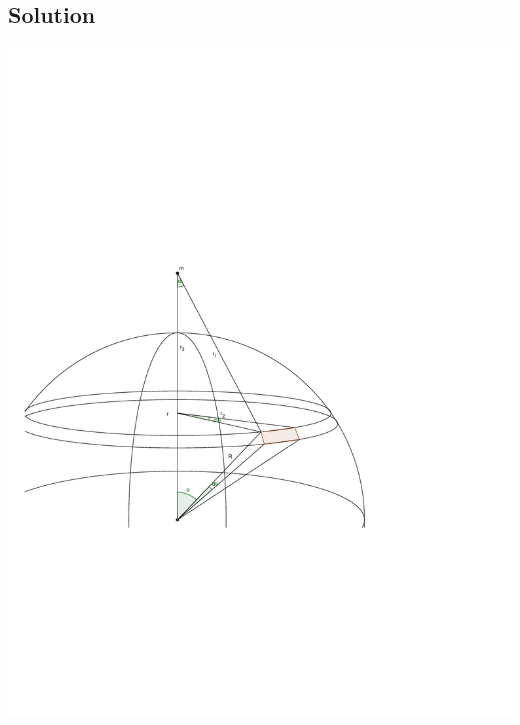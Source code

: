 \documentclass[solutions]{esg8012pset}
\begin{document}
\subsection*{Solution}
  \begin{center}\includegraphics[width=.5\textwidth]{2009-10-02_Diagram_2_1}\end{center}
\end{document}
